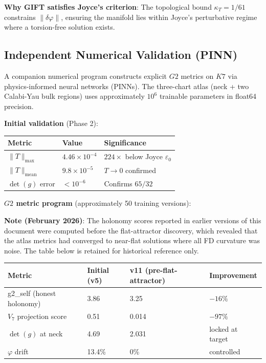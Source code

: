 \documentclass[11pt,a4paper]{article}
\newcommand{\Gtwo}{\mathrm{G}_2}
\newcommand{\Kseven}{K_7}
\def\Gtwo{G2}%
\def\Kseven{K7}%
\begin{document}
\textbf{Why GIFT satisfies Joyce's criterion}: The topological bound $\kappa_T = 1/61$ constrains $\|\delta\varphi\|$, ensuring the manifold lies within Joyce's perturbative regime where a torsion-free solution exists.

\subsection{Independent Numerical Validation (PINN)}

A companion numerical program constructs explicit $\Gtwo$ metrics on $\Kseven$ via physics-informed neural networks (PINNs). The three-chart atlas (neck + two Calabi-Yau bulk regions) uses approximately $10^6$ trainable parameters in float64 precision.

\textbf{Initial validation} (Phase 2):

\begin{table}[H]
\centering
\begin{tabular}{lll}
\toprule
Metric & Value & Significance \\
\midrule
$\|T\|_{\max}$ & $4.46 \times 10^{-4}$ & $224\times$ below Joyce $\varepsilon_0$ \\
$\|T\|_{\text{mean}}$ & $9.8 \times 10^{-5}$ & $T \to 0$ confirmed \\
$\det(g)$ error & $< 10^{-6}$ & Confirms $65/32$ \\
\bottomrule
\end{tabular}
\end{table}

\textbf{$\Gtwo$ metric program} (approximately 50 training versions):

\textbf{Note (February 2026)}: The holonomy scores reported in earlier versions of this document were computed before the flat-attractor discovery, which revealed that the atlas metrics had converged to near-flat solutions where all FD curvature was noise. The table below is retained for historical reference only.

\begin{table}[H]
\centering
\begin{tabular}{llll}
\toprule
Metric & Initial (v5) & v11 (pre-flat-attractor) & Improvement \\
\midrule
g2\_self (honest holonomy) & 3.86 & 3.25 & $-16\%$ \\
$V_7$ projection score & 0.51 & 0.014 & $-97\%$ \\
$\det(g)$ at neck & 4.69 & 2.031 & locked at target \\
$\varphi$ drift & 13.4\% & 0\% & controlled \\
\bottomrule
\end{tabular}
\end{table}
\end{document}
